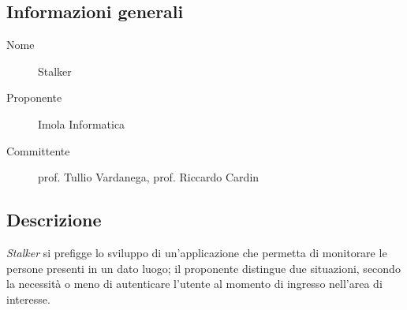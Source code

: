 \documentclass[../studio-di-fattibilita.tex]{subfiles}
\begin{document}
	\subsection{Informazioni generali}
	\label{subsec:informazioni_generali}
	\begin{description}
		\item[Nome] Stalker
		\item[Proponente] Imola Informatica
		\item[Committente] prof. Tullio Vardanega, prof. Riccardo Cardin
	\end{description}
	\subsection{Descrizione}
	\label{subsec:descrizione}
	\textit{Stalker} si prefigge lo sviluppo di un'applicazione che permetta di monitorare le persone presenti in un dato luogo; il proponente distingue due situazioni, secondo la necessità o meno di autenticare l'utente al momento di ingresso nell'area di interesse.
\end{document}
